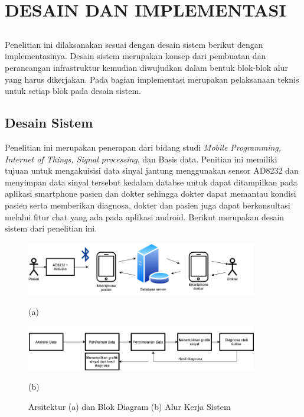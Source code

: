 \chapter{DESAIN DAN IMPLEMENTASI}
\vspace{1ex}

\section*{}
	Penelitian ini dilaksanakan sesuai dengan desain sistem berikut dengan implementasinya. Desain sistem merupakan konsep dari pembuatan dan perancangan infrastruktur kemudian diwujudkan dalam bentuk blok-blok alur yang harus dikerjakan. Pada bagian implementasi merupakan pelaksanaan teknis untuk setiap blok pada desain sistem.
\vspace{1ex}

\section{Desain Sistem}
\vspace{1ex}
Penelitian ini merupakan penerapan dari bidang studi \textit{Mobile
Programming, Internet of Things, Signal processing}, dan Basis data. Penitian ini memiliki tujuan untuk
mengakuisisi data sinyal jantung menggunakan sensor AD8232 dan menyimpan data sinyal tersebut kedalam databse untuk dapat ditampilkan pada aplikasi smartphone pasien dan dokter sehingga dokter dapat memantau kondisi pasien serta memberikan diagnosa, dokter dan pasien juga dapat berkonsultasi melalui fitur chat yang ada pada aplikasi android. Berikut merupakan desain sistem dari penelitian ini.

\vspace{1ex}

\begin{figure}[H] \centering
	\includegraphics[width=0.9\textwidth]{img/arsitektur.png}
	
	(a)
	
	\includegraphics[width=0.9\textwidth]{img/blockdiagram.png}
	
	(b)
	
	\caption{Arsitektur (a) dan Blok Diagram (b) Alur Kerja Sistem}
	\label{fig:3.1}
\end{figure}
\vspace{1ex}

